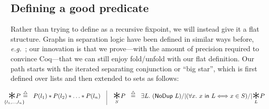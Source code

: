 %



\subsection{Defining a good  predicate}\label{sec:goodgraph}

Rather than trying to define  as a recursive fixpoint,
we will instead give it a flat structure.  Graphs in separation
logic have been defined in similar ways before, \emph{e.g.}~\cite{ilya-graphs};
our innovation is that we prove---with the amount of precision
required to convince Coq---that we can still enjoy fold/unfold
with our flat definition.  Our path starts with the iterated
separating conjunction or ``big star'', which is first defined over
lists and then extended to sets as follows:

\vspace{-1em}
\[
\begin{array}{@{}l@{}}
\!\!\!\!\!\!\!\underset{\{l_1,\dots,l_n\}}{\bigstar P}\!\!\!\!\!\!\! ~~ \defeq ~~ P(l_1) *
  P(l_2) * \dots * P(l_n) \quad \vline \quad
\underset{S}{\bigstar} P ~~ \defeq ~~ \exists L.~ (\p{NoDup}\ L) /| (\forall x.~ x\ \p{in}\ L <=> x \in S) /| \underset{L}{\bigstar}P
\end{array}
\]

